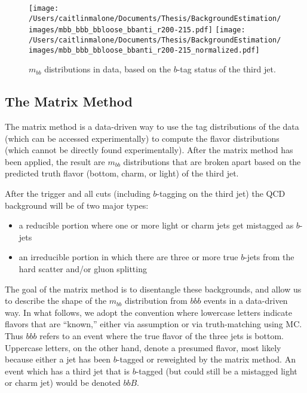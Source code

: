 \begin{figure}[hbt]
  \texttt{[image: /Users/caitlinmalone/Documents/Thesis/BackgroundEstimation/images/mbb\_bbb\_bbloose\_bbanti\_r200-215.pdf]}
  \texttt{[image: /Users/caitlinmalone/Documents/Thesis/BackgroundEstimation/images/mbb\_bbb\_bbloose\_bbanti\_r200-215\_normalized.pdf]}
  \caption{$m_{bb}$ distributions in data, based on the $b$-tag status of the third jet. 
    \label{fig:mbb_data} }
\end{figure}


\subsection{The Matrix Method}
The matrix method is a data-driven way to use the tag distributions of the data (which can be accessed experimentally) to compute the flavor distributions (which cannot be directly found experimentally).  After the matrix method has been applied, the result are $m_{bb}$ distributions that are broken apart based on the predicted truth flavor (bottom, charm, or light) of the third jet.  

After the trigger and all cuts (including $b$-tagging on the third jet) the QCD background will be of two major types:

\begin{itemize}
    \item a reducible portion where one or more light or charm jets get mistagged as $b$-jets
    \item an irreducible portion in which there are three or more true $b$-jets from the
hard scatter and/or gluon splitting
\end{itemize}


The goal of the matrix method is to disentangle these backgrounds, and allow us to describe the shape of the $m_{bb}$ distribution from $bbb$ events
in a data-driven way.  In what follows, we adopt the convention where lowercase letters indicate flavors
that are ``known,'' either via assumption or via truth-matching using MC.  Thus $bbb$ refers to an event where the true flavor of the three jets is bottom.  Uppercase letters,
on the other hand, denote a presumed flavor, most likely because either a jet has been $b$-tagged or reweighted by the matrix method.  An event which has a third jet
that is $b$-tagged (but could still be a mistagged light or charm jet) would be
denoted $bbB$.  

